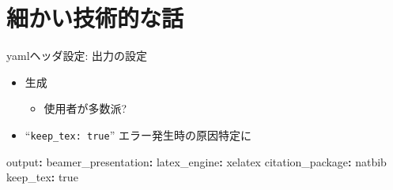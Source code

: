 \documentclass[
  12pt,
  ignorenonframetext,
]{beamer}
\newenvironment{Shaded}{\begin{snugshade}}{\end{snugshade}}
\newcommand{\AttributeTok}[1]{\textcolor[rgb]{0.77,0.63,0.00}{#1}}
\newcommand{\CharTok}[1]{\textcolor[rgb]{0.31,0.60,0.02}{#1}}
\newcommand{\FunctionTok}[1]{\textcolor[rgb]{0.00,0.00,0.00}{#1}}
\newcommand{\KeywordTok}[1]{\textcolor[rgb]{0.13,0.29,0.53}{\textbf{#1}}}
\providecommand{\tightlist}{%
  \setlength{\itemsep}{0pt}\setlength{\parskip}{0pt}}
\begin{document}
\hypertarget{ux7d30ux304bux3044ux6280ux8853ux7684ux306aux8a71}{%
\section{細かい技術的な話}\label{ux7d30ux304bux3044ux6280ux8853ux7684ux306aux8a71}}

\begin{frame}[fragile]{yamlヘッダ設定: 出力の設定}
\protect\hypertarget{yamlux30d8ux30c3ux30c0ux8a2dux5b9a-ux51faux529bux306eux8a2dux5b9a}{}

\begin{itemize}
\tightlist
\item
  \XeLaTeX 生成

  \begin{itemize}
  \tightlist
  \item
    \LuaLaTeX 使用者が多数派?
  \end{itemize}
\item
  ``\texttt{keep\_tex:\ true}'' エラー発生時の原因特定に
\end{itemize}

\begin{Shaded}
\begin{Highlighting}[]
\FunctionTok{output}\KeywordTok{:}
\AttributeTok{  }\FunctionTok{beamer_presentation}\KeywordTok{:}
\AttributeTok{    }\FunctionTok{latex_engine}\KeywordTok{:}\AttributeTok{ xelatex}
\AttributeTok{    }\FunctionTok{citation_package}\KeywordTok{:}\AttributeTok{ natbib}
\AttributeTok{    }\FunctionTok{keep_tex}\KeywordTok{:}\AttributeTok{ }\CharTok{true}
\end{Highlighting}
\end{Shaded}

\end{frame}
\end{document}

